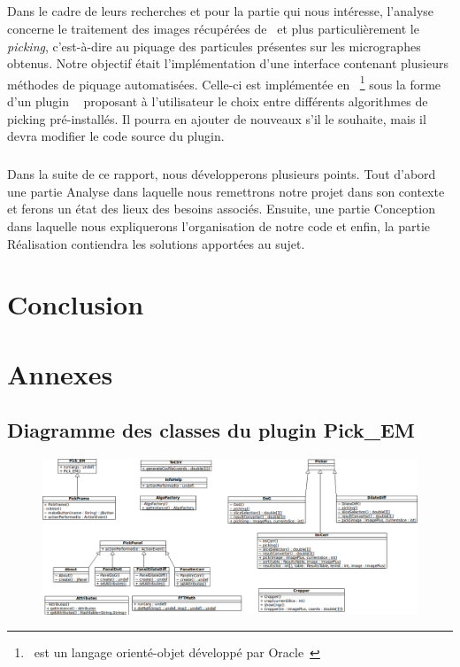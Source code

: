 \documentclass[12pt,a4paper]{report}
\begin{document}
\paragraph*{}
Dans le cadre de leurs recherches et pour la partie qui nous intéresse, l'analyse concerne le traitement des images récupérées de \cme\ et plus particulièrement le \emph{picking}, c'est-à-dire au piquage des particules présentes sur les micrographes obtenus. %
Notre objectif était l'implémentation d'une interface contenant plusieurs méthodes de piquage automatisées.
Celle-ci est implémentée en \java ~\footnote{\java\ est un langage orienté-objet développé par Oracle~\cite{java:url}} sous la forme d'un plugin \imj ~\cite{imagej:url} proposant à l'utilisateur le choix entre différents algorithmes de picking pré-installés. Il pourra en ajouter de nouveaux s'il le souhaite, mais il devra modifier le code source du plugin. 

\paragraph*{}
Dans la suite de ce rapport, nous développerons plusieurs points. Tout d'abord une partie Analyse dans laquelle nous remettrons notre projet dans son contexte et ferons un état des lieux des besoins associés. Ensuite, une partie Conception dans laquelle nous expliquerons l'organisation de notre code et enfin, la partie Réalisation contiendra les solutions apportées au sujet.







\chapter*{Conclusion}





\appendix
\chapter{Annexes}


\newpage

\section{Diagramme des classes du plugin Pick\_EM}

\begin{figure}[!ht] 
\begin{center}
\includegraphics[width=1.4\textwidth, angle=90]{diagComplet.png}
\end{center}
\end{figure}
\end{document}
